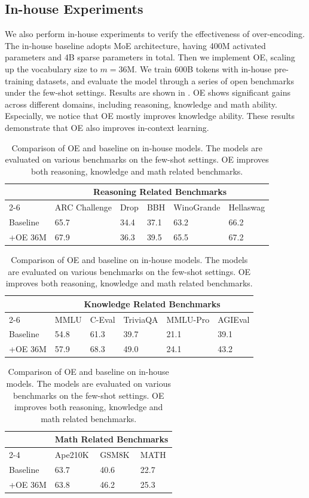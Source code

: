 \subsection{In-house Experiments}
We also perform in-house experiments to verify the effectiveness of over-encoding. The in-house baseline adopts MoE architecture, having 400M activated parameters and 4B sparse parameters in total. Then we implement OE, scaling up the vocabulary size to $m=36\mathrm{M}$. We train 600B tokens with in-house pre-training datasets, and evaluate the model through a series of open benchmarks under the few-shot settings. Results are shown in . OE shows significant gains across different domains, including reasoning, knowledge and math ability. Especially, we notice that OE mostly improves knowledge ability. These results demonstrate that OE also improves in-context learning.

\begin{table}[h]
\centering
\caption{Comparison of OE and baseline on in-house models. The models are evaluated on various benchmarks on the few-shot settings. OE improves both reasoning, knowledge and math related benchmarks.}
\label{tab:in_house_icl_eval}

\begin{tabular}{|l|l|l|l|l|l|}
\hline
& \multicolumn{5}{c|}{Reasoning Related Benchmarks} \\ \cline{2-6}
& ARC Challenge & Drop & BBH & WinoGrande & Hellaswag \\ \hline
Baseline & 65.7 & 34.4 & 37.1 & 63.2 & 66.2 \\ \hline
+OE 36M & 67.9 & 36.3 & 39.5 & 65.5 & 67.2 \\ \hline
\end{tabular}

\vspace{10pt}

\begin{tabular}{|l|l|l|l|l|l|}
\hline
& \multicolumn{5}{c|}{Knowledge Related Benchmarks} \\ \cline{2-6}
& MMLU & C-Eval & TriviaQA & MMLU-Pro & AGIEval \\ \hline
Baseline & 54.8 & 61.3 & 39.7 & 21.1 & 39.1 \\ \hline
+OE 36M & 57.9 & 68.3 & 49.0 & 24.1 & 43.2 \\ \hline
\end{tabular}

\vspace{10pt}

\begin{tabular}{|l|l|l|l|}
\hline
& \multicolumn{3}{c|}{Math Related Benchmarks} \\ \cline{2-4}
& Ape210K & GSM8K & MATH \\ \hline
Baseline & 63.7 & 40.6 & 22.7 \\ \hline
+OE 36M & 63.8 & 46.2 & 25.3 \\ \hline
\end{tabular}
\end{table}


